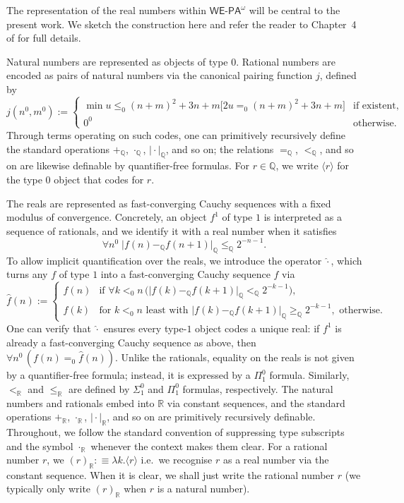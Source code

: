 \documentclass[11pt]{amsart}
\theoremstyle{definition}
\theoremstyle{remark}
\def\QQ{\mathbb{Q}}
\def\RR{\mathbb{R}}
\newcommand{\WEPAomega}{\textsf{WE}\mbox{-}\textsf{PA}^\omega}
\begin{document}
The representation of the real numbers within $\WEPAomega$ will be central to
the present work. We sketch the construction here and refer the reader to
Chapter~4 of \cite{Kohlenbach2008} for full details. 

Natural numbers are represented as objects of type $0$. Rational numbers are
encoded as pairs of natural numbers via the canonical pairing function $j$,
defined by
\[
  j(n^0,m^0) := \begin{cases}
    \min u \leq_0 (n+m)^2+3n+m \bigl[2u =_0 (n+m)^2+3n+m\bigr]
      & \text{if existent,} \\
    0^0 & \text{otherwise.}
  \end{cases}
\]
Through terms operating on such codes, one can primitively recursively define
the standard operations $+_\mathbb{Q}$, $\cdot_\mathbb{Q}$,
$\vert\cdot\vert_\mathbb{Q}$, and so on; the relations $=_\mathbb{Q}$,
$<_\mathbb{Q}$, and so on are likewise definable by quantifier-free formulas. For $r \in \QQ$, we write $\langle r \rangle$ for the type 0 object that codes for $r$.

The reals are represented as fast-converging Cauchy sequences with a fixed
modulus of convergence. Concretely, an object $f^1$ of type $1$ is interpreted
as a sequence of rationals, and we identify it with a real number when it
satisfies
\[
  \forall n^0\; \lvert f(n) -_{\QQ} f(n+1) \rvert_\QQ \le_\QQ 2^{-n-1}.
\]
To allow implicit quantification over the reals, we introduce the operator
$\widehat{\cdot}$, which turns any $f$ of type $1$ into a fast-converging
Cauchy sequence $\widehat{f}$ via
\[
  \widehat{f}(n) := \begin{cases}
    f(n)
      & \text{if } \forall k <_0 n\,
        \bigl(\lvert f(k) -_\mathbb{Q} f(k+1) \rvert_\mathbb{Q}
        <_\mathbb{Q} 2^{-k-1}\bigr), \\
    f(k)
      & \text{for $k <_0 n$ least with }
        \lvert f(k) -_\mathbb{Q} f(k+1) \rvert_\mathbb{Q}
        \geq_\mathbb{Q} 2^{-k-1}, \text{ otherwise.}
  \end{cases}
\]
One can verify that $\widehat{\cdot}$ ensures every type-$1$ object codes a
unique real: if $f^1$ is already a fast-converging Cauchy sequence as above,
then $\forall n^0\,(f(n) =_0 \widehat{f}(n))$. Unlike the rationals, equality
on the reals is not given by a quantifier-free formula; instead, it is expressed by a $\Pi^0_1$ formula. Similarly, $<_\RR$ and $\le_\RR$ are defined by $\Sigma^0_1$ and $\Pi^0_1$
formulas, respectively. The natural numbers and rationals embed into $\RR$ via
constant sequences, and the standard operations $+_\mathbb{R}$,
$\cdot_\mathbb{R}$, $\vert\cdot\vert_\mathbb{R}$, and so on are primitively
recursively definable. Throughout, we follow the standard convention of
suppressing type subscripts and the symbol $\cdot_\mathbb{R}$ whenever the
context makes them clear. For a rational number $r$, we $(r)_\RR:\equiv \lambda k. \langle r \rangle$ i.e.\ we recognise $r$ as a real number via the constant sequence. When it is clear, we shall just write the rational number $r$ (we typically only write $(r)_\RR$ when $r$ is a natural number).
\end{document}
